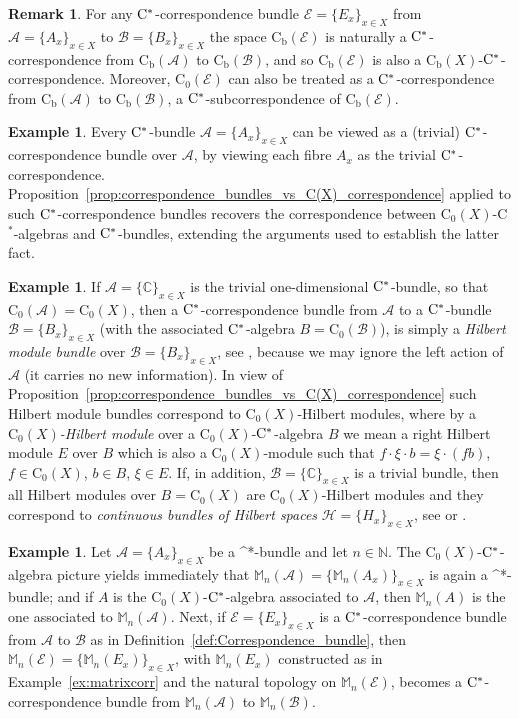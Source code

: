 \documentclass[11 pt, leqno]{amsart}
\numberwithin{equation}{section}
\theoremstyle{plain}
\theoremstyle{definition}
\newtheorem {rem} [thm]{Remark}
\newtheorem{ex}[thm]{Example}
\newcommand*{\Cst}{\mathrm \cst}%
\newcommand{\Mat}{\mathbb M} %
\newcommand*{\contz}{\mathrm{C_0}}%
\newcommand*{\contb}{\mathrm{C_b}}%
\renewcommand{\H}{\mathcal H}
\newcommand{\B}{\mathcal B}
\newcommand{\EE}{\mathcal E}
\newcommand{\A}{\mathcal A}
\newcommand{\C}{\mathbb C}
\newcommand{\N}{\mathbb N}
\newcommand{\cst}{\ifmmode\mathrm{C}^*\else{$\mathrm{C}^*$}\fi}
\begin{document}
\begin{rem}
For any $\cst$-correspondence bundle $\EE=\{E_x\}_{x\in X}$ from  $\A=\{A_x\}_{x\in X}$ to $\B=\{B_x\}_{x\in X}$ the space $\contb(\EE)$ is naturally a $\cst$-correspondence from $\contb(\A)$ to $\contb(\B)$, and so $\contb(\EE)$ is also a $\contb(X)$-$\cst$-correspondence. 
Moreover, $\contz(\EE)$ can also be treated as a $\cst$-correspondence from $\contb(\A)$ to $\contb(\B)$, a $\cst$-subcorrespondence of $\contb(\EE)$.
\end{rem}

\begin{ex}
Every $\cst$-bundle $\A=\{A_x\}_{x\in X}$ can be viewed as a (trivial) $\cst$-correspondence bundle over $\A$, by viewing each fibre $A_x$ as the trivial $\cst$-correspondence. 
Proposition~\ref{prop:correspondence_bundles_vs_C(X)_correspondence} applied to such  $\cst$-correspondence bundles recovers the correspondence between $\contz(X)$-C$^*$-algebras and $\cst$-bundles, extending the arguments used to establish the latter fact.%
\end{ex}

\begin{ex}
If $\A=\{\C\}_{x\in X}$ is the trivial one-dimensional $\cst$-bundle, so that $\contz(\A)=\contz(X)$, then a $\cst$-correspondence bundle from $\A$ to a $\cst$-bundle $\B=\{B_x\}_{x\in X}$ (with the associated $\cst$-algebra $B=\contz(\B)$), is simply a \emph{Hilbert module bundle} over $\B=\{B_x\}_{x\in X}$, 
see \cite[1.7]{Kumjian}, because we may ignore the left action of $\A$ (it carries no new information). 
In view of Proposition~\ref{prop:correspondence_bundles_vs_C(X)_correspondence} such Hilbert module bundles correspond to $\contz(X)$-Hilbert modules, 
where by a \emph{$\contz(X)$-Hilbert module}  over a $\contz(X)$-$\Cst$-algebra $B$ we mean  a right Hilbert module $E$ over $B$ which is also 
 a $\contz(X)$-module such that 
 $ f\cdot \xi \cdot b = \xi\cdot  (f b)$, $f\in \contz(X)$,  $b\in B$, $\xi \in E$. 
If, in addition, $\B=\{\C\}_{x\in X}$ is a trivial bundle, then all Hilbert modules over $B=\contz(X)$ are $\contz(X)$-Hilbert modules and they correspond to \emph{continuous bundles of Hilbert spaces} $\H=\{H_x\}_{x\in X}$, see \cite[Definition~II.13.5]{Fell_Doran} or \cite{RenaultFourier}. 
\end{ex}

\begin{ex} \label{ex:matrixbundles}
Let $\A=\{A_x\}_{x \in X}$ be a \cst-bundle and let $n \in \N$. 
The $\contz(X)$-$\cst$-algebra picture yields immediately that $\Mat_n(\A)= \{\Mat_n(A_x)\}_{x \in X}$ is again a \cst-bundle; and if $A$ is the $\contz(X)$-$\cst$-algebra associated to $\A$, then $\Mat_n(A)$ is the one associated to $\Mat_n(\A)$. 
Next, if $\EE=\{E_x\}_{x \in X}$ is a $\cst$-correspondence bundle from $\A$ to $\B$ as in Definition~\ref{def:Correspondence_bundle}, then $\Mat_n(\EE)=\{\Mat_n(E_x)\}_{x \in X}$, with $\Mat_n(E_x)$ constructed as in Example~\ref{ex:matrixcorr} and the natural topology on $\Mat_n(\EE)$, becomes a $\cst$-correspondence bundle from $\Mat_n(\A)$ to $\Mat_n(\B)$.
\end{ex}
\end{document}
